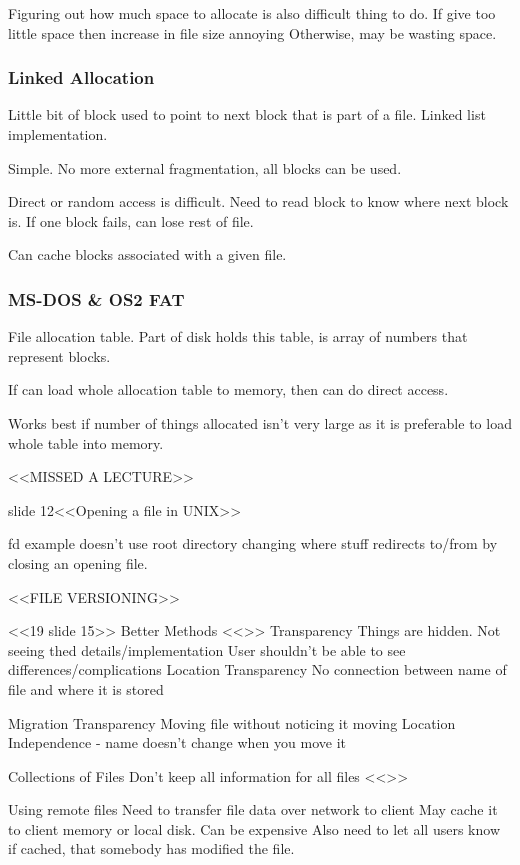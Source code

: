 \documentclass{article}
\begin{document}
			Figuring out how much space to allocate is also difficult thing to do.
			If give too little space then increase in file size annoying
			Otherwise, may be wasting space.

		\subsubsection{Linked Allocation}
			Little bit of block used to point to next block that is part of a file.
			Linked list implementation.

			Simple.
			No more external fragmentation, all blocks can be used.

			Direct or random access is difficult.
			Need to read block to know where next block is.
			If one block fails, can lose rest of file.

			Can cache blocks associated with a given file.

		\subsubsection{MS-DOS \& OS2 FAT}
			File allocation table.
			Part of disk holds this table, is array of numbers that represent blocks.

			If can load whole allocation table to memory, then can do direct access.

			Works best if number of things allocated isn't very large as it is preferable to load whole table into memory.


<<MISSED A LECTURE>>

	slide 12<<Opening a file in UNIX>>

		fd example doesn't use root directory
		changing where stuff redirects to/from by closing an opening file.

<<FILE VERSIONING>>
	
<<19 slide 15>>
	Better Methods
		<<>>
	Transparency
		Things are hidden. Not seeing thed details/implementation
		User shouldn't be able to see differences/complications
		Location Transparency
			No connection between name of file and where it is stored


		Migration Transparency
			Moving file without noticing it moving
			Location Independence - name doesn't change when you move it


	Collections of Files
		 Don't keep all information for all files
		 <<>>

	Using remote files
		Need to transfer file data over network to client
		May cache it to client memory or local disk.
		Can be expensive
		Also need to let all users know if cached, that somebody has modified the file.
\end{document}
